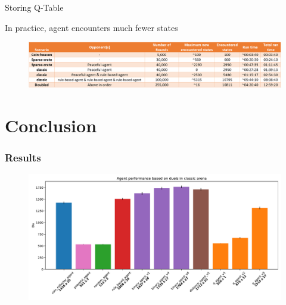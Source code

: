 \documentclass{beamer}
\begin{document}
\begin{frame}{Storing Q-Table}
	\begin{center}
	In practice, agent encounters much fewer states
	\end{center}

	\begin{figure}[t]
			\centering
			\includegraphics[width=1\linewidth]{table.png}
	\end{figure}
\end{frame}

\section{Conclusion}

\begin{frame}[fragile]
	\frametitle{Results}
	\pause

	\begin{figure}[t]
			\centering
			\includegraphics[width=1\linewidth]{elo.pdf}
	\end{figure}
\end{frame}
\end{document}

